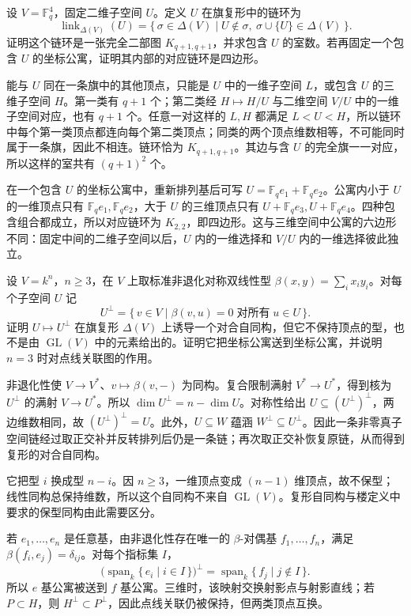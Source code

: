 \begin{exercise}\label{b5:ex:F-flag-link}
	设 \(V=\mathbb F_q^4\)，固定二维子空间 \(U\)。定义 \(U\) 在旗复形中的链环为
	\[
		\operatorname{link}_{\Delta(V)}(U)
		=\{\,\sigma\in\Delta(V)\mid U\notin\sigma,\ \sigma\cup\{U\}\in\Delta(V)\,\}.
	\]
	证明这个链环是一张完全二部图 \(K_{q+1,q+1}\)，并求包含 \(U\) 的室数。若再固定一个包含 \(U\) 的坐标公寓，证明其内部的对应链环是四边形。
\end{exercise}
\begin{solution}
	能与 \(U\) 同在一条旗中的其他顶点，只能是 \(U\) 中的一维子空间 \(L\)，或包含 \(U\) 的三维子空间 \(H\)。第一类有 \(q+1\) 个；第二类经 \(H\mapsto H/U\) 与二维空间 \(V/U\) 中的一维子空间对应，也有 \(q+1\) 个。任意一对这样的 \(L,H\) 都满足 \(L<U<H\)，所以链环中每个第一类顶点都连向每个第二类顶点；同类的两个顶点维数相等，不可能同时属于一条旗，因此不相连。链环恰为 \(K_{q+1,q+1}\)。其边与含 \(U\) 的完全旗一一对应，所以这样的室共有 \((q+1)^2\) 个。

	在一个包含 \(U\) 的坐标公寓中，重新排列基后可写 \(U=\mathbb F_q e_1+\mathbb F_q e_2\)。公寓内小于 \(U\) 的一维顶点只有 \(\mathbb F_q e_1,\mathbb F_q e_2\)，大于 \(U\) 的三维顶点只有 \(U+\mathbb F_q e_3,U+\mathbb F_q e_4\)。四种包含组合都成立，所以对应链环为 \(K_{2,2}\)，即四边形。这与三维空间中公寓的六边形不同：固定中间的二维子空间以后，\(U\) 内的一维选择和 \(V/U\) 内的一维选择彼此独立。
\end{solution}

\begin{exercise}\label{b5:ex:F-building-duality}
	设 \(V=k^n\)，\(n\ge3\)，在 \(V\) 上取标准非退化对称双线性型 \(\beta(x,y)=\sum_i x_i y_i\)。对每个子空间 \(U\) 记
	\[
		U^\perp=\{\,v\in V\mid\beta(v,u)=0\;\text{对所有}\;u\in U\,\}.
	\]
	证明 \(U\mapsto U^\perp\) 在旗复形 \(\Delta(V)\) 上诱导一个对合自同构，但它不保持顶点的型，也不是由 \(\operatorname{GL}(V)\) 中的元素给出的。证明它把坐标公寓送到坐标公寓，并说明 \(n=3\) 时对点线关联图的作用。
\end{exercise}
\begin{solution}
	非退化性使 \(V\to V^*\)、\(v\mapsto\beta(v,-)\) 为同构。复合限制满射 \(V^*\to U^*\)，得到核为 \(U^\perp\) 的满射 \(V\to U^*\)。所以 \(\dim U^\perp=n-\dim U\)。对称性给出 \(U\subseteq(U^\perp)^\perp\)，两边维数相同，故 \((U^\perp)^\perp=U\)。此外，\(U\subseteq W\) 蕴涵 \(W^\perp\subseteq U^\perp\)。因此一条非零真子空间链经过取正交补并反转排列后仍是一条链；再次取正交补恢复原链，从而得到复形的对合自同构。

	它把型 \(i\) 换成型 \(n-i\)。因 \(n\ge3\)，一维顶点变成 \((n-1)\) 维顶点，故不保型；线性同构总保持维数，所以这个自同构不来自 \(\operatorname{GL}(V)\)。复形自同构与楼定义中要求的保型同构由此需要区分。

	若 \(e_1,\ldots,e_n\) 是任意基，由非退化性存在唯一的 \(\beta\)-对偶基 \(f_1,\ldots,f_n\)，满足 \(\beta(f_i,e_j)=\delta_{ij}\)。对每个指标集 \(I\)，
	\[
		\bigl(\operatorname{span}_k\{\,e_i\mid i\in I\,\}\bigr)^\perp
		=\operatorname{span}_k\{\,f_j\mid j\notin I\,\}.
	\]
	所以 \(e\) 基公寓被送到 \(f\) 基公寓。三维时，该映射交换射影点与射影直线；若 \(P\subset H\)，则 \(H^\perp\subset P^\perp\)，因此点线关联仍被保持，但两类顶点互换。
\end{solution}

